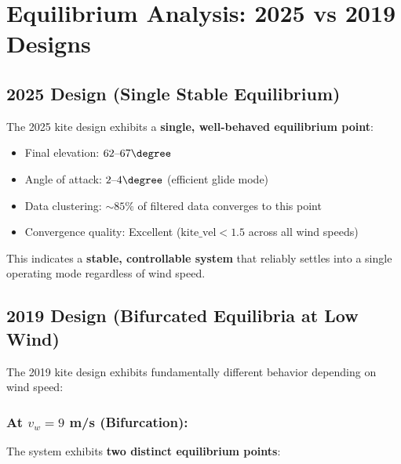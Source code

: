 \section*{Equilibrium Analysis: 2025 vs 2019 Designs}

\subsection*{2025 Design (Single Stable Equilibrium)}

The 2025 kite design exhibits a \textbf{single, well-behaved equilibrium point}:
\begin{itemize}
    \item Final elevation: $62\text{--}67\degree$
    \item Angle of attack: $2\text{--}4\degree$ (efficient glide mode)
    \item Data clustering: $\sim 85\%$ of filtered data converges to this point
    \item Convergence quality: Excellent ($\text{kite\_vel} < 1.5$ across all wind speeds)
\end{itemize}

This indicates a \textbf{stable, controllable system} that reliably settles into a single operating mode regardless of wind speed.

\subsection*{2019 Design (Bifurcated Equilibria at Low Wind)}

The 2019 kite design exhibits fundamentally different behavior depending on wind speed:

\subsubsection*{At $v_w = 9$ m/s (Bifurcation):}

The system exhibits \textbf{two distinct equilibrium points}:

